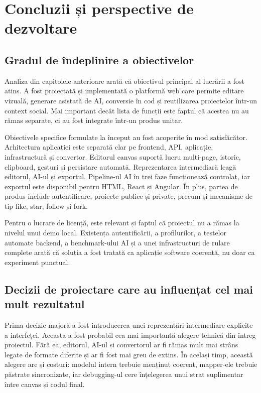 \chapter{Concluzii și perspective de dezvoltare}

\section{Gradul de îndeplinire a obiectivelor}

Analiza din capitolele anterioare arată că obiectivul principal al lucrării a fost atins. A fost proiectată și implementată o platformă web care permite editare vizuală, generare asistată de AI, conversie în cod și reutilizarea proiectelor într-un context social. Mai important decât lista de funcții este faptul că acestea nu au rămas separate, ci au fost integrate într-un produs unitar.

Obiectivele specifice formulate la început au fost acoperite în mod satisfăcător. Arhitectura aplicației este separată clar pe frontend, API, aplicație, infrastructură și convertor. Editorul canvas suportă lucru multi-page, istoric, clipboard, gesturi și persistare automată. Reprezentarea intermediară leagă editorul, AI-ul și exportul. Pipeline-ul AI în trei faze funcționează controlat, iar exportul este disponibil pentru HTML, React și Angular. În plus, partea de produs include autentificare, proiecte publice și private, precum și mecanisme de tip like, star, follow și fork.

Pentru o lucrare de licență, este relevant și faptul că proiectul nu a rămas la nivelul unui demo local. Existența autentificării, a profilurilor, a testelor automate backend, a benchmark-ului AI și a unei infrastructuri de rulare complete arată că soluția a fost tratată ca aplicație software coerentă, nu doar ca experiment punctual.

\section{Decizii de proiectare care au influențat cel mai mult rezultatul}

Prima decizie majoră a fost introducerea unei reprezentări intermediare explicite a interfeței. Aceasta a fost probabil cea mai importantă alegere tehnică din întreg proiectul. Fără ea, editorul, AI-ul și convertorul ar fi rămas mult mai strâns legate de formate diferite și ar fi fost mai greu de extins. În același timp, această alegere are și costuri: modelul intern trebuie menținut coerent, mapper-ele trebuie păstrate sincronizate, iar debugging-ul cere înțelegerea unui strat suplimentar între canvas și codul final.

